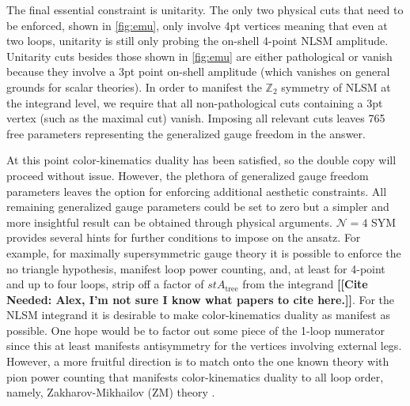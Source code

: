 \documentclass[11pt,letter]{article}
\newcommand{\citepls}[1]{{\bf\color{red}[[Cite Needed: #1]]}}
\begin{document}
The final essential constraint is unitarity.
The only two physical cuts that need to be enforced, shown in \cref{fig:emu}, only involve 4pt vertices meaning that even at two loops, unitarity is still only probing the on-shell 4-point NLSM amplitude.
Unitarity cuts besides those shown in \cref{fig:emu} are either pathological or vanish because they involve a 3pt point on-shell amplitude (which vanishes on general grounds for scalar theories).
In order to manifest the $\mathbb{Z}_2$ symmetry of NLSM at the integrand level, we require that all non-pathological cuts containing a 3pt vertex (such as the maximal cut) vanish.
Imposing all relevant cuts leaves 765 free parameters representing the generalized gauge freedom in the answer.


At this point color-kinematics duality has been satisfied, so the double copy will proceed without issue.
However, the plethora of generalized gauge freedom parameters leaves the option for enforcing additional aesthetic constraints.
All remaining generalized gauge parameters could be set to zero but a simpler and more insightful result can be obtained through physical arguments.
$\mathcal{N}=4$ SYM provides several hints for further conditions to impose on the ansatz.
For example, for maximally supersymmetric gauge theory it is possible to enforce the no triangle hypothesis, manifest loop power counting, and, at least for 4-point and up to four loops, strip off a factor of $st A_\text{tree}$ from the integrand \citepls{Alex, I'm not sure I know what papers to cite here.}.
For the NLSM integrand it is desirable to make color-kinematics duality as manifest as possible.
One hope would be to factor out some piece of the 1-loop numerator since this at least manifests antisymmetry for the vertices involving external legs.
However, a more fruitful direction is to match onto the one known theory with pion power counting that manifests color-kinematics duality to all loop order, namely, Zakharov-Mikhailov (ZM) theory \cite{Zakharov:1973pp, Cheung:2022mix}.
\end{document}
